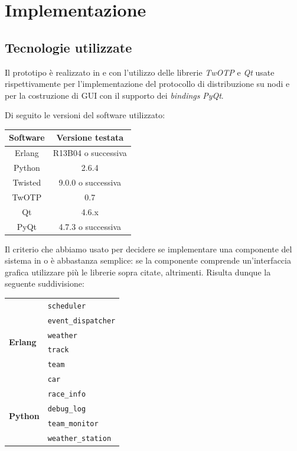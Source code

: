 \chapter{Implementazione}

\section{Tecnologie utilizzate}
Il prototipo è realizzato in \Erlang{} e \Python{} con l'utilizzo delle librerie \textsl{TwOTP} e \textsl{Qt} usate rispettivamente per l'implementazione del protocollo di distribuzione \Erlang{} su nodi \Python{} e per la costruzione di GUI con il supporto dei \textit{bindings} \textsl{PyQt}.

Di seguito le versioni del software utilizzato:
\begin{center}
\begin{tabular}{c|c}
\textbf{Software} & \textbf{Versione testata} \\
\hline
Erlang & R13B04 o successiva \\
\hline
Python & 2.6.4 \\
\hline
Twisted & 9.0.0 o successiva \\
TwOTP & 0.7 \\
\hline
Qt & 4.6.x \\
PyQt & 4.7.3 o successiva \\
\end{tabular}
\end{center}

Il criterio che abbiamo usato per decidere se implementare una componente del sistema in \Erlang{} o \Python{} è abbastanza semplice: se la componente comprende un'interfaccia grafica utilizzare \Python{} più le librerie sopra citate, \Erlang{} altrimenti. Risulta dunque la seguente suddivisione:
\begin{center}
\begin{tabular}{|p{}|p{}|}
\hline
\multirow{6}{*}{\textbf{Erlang}} & \texttt{scheduler}\\
& \texttt{event\_dispatcher}\\
& \texttt{weather}\\
& \texttt{track}\\
& \texttt{team}\\
& \texttt{car} \\
\hline
\multirow{4}{*}{\textbf{Python}} & \texttt{race\_info}\\
& \texttt{debug\_log}\\
& \texttt{team\_monitor}\\
& \texttt{weather\_station}\\
\hline
\end{tabular}
\end{center}

